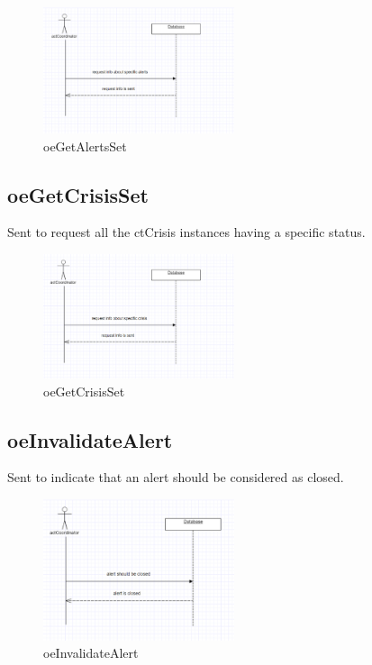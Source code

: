 \begin{figure}[H]
\begin{center}
\includegraphics[width=0.5\textwidth]{./images/oeGetAlertsSet.eps} 
\end{center}
\caption{oeGetAlertsSet}
\end{figure}

\subsection{oeGetCrisisSet}
Sent to request all the ctCrisis instances having a specific status.

\begin{figure}[H]
\begin{center}
\includegraphics[width=0.5\textwidth]{./images/oeGetCrisisSet.eps} 
\end{center}
\caption{oeGetCrisisSet}
\end{figure}

\subsection{oeInvalidateAlert}
Sent to indicate that an alert should be considered as closed.

\begin{figure}[H]
\begin{center}
\includegraphics[width=0.5\textwidth]{./images/oeInvalidateAlert.eps} 
\end{center}
\caption{oeInvalidateAlert}
\end{figure}

